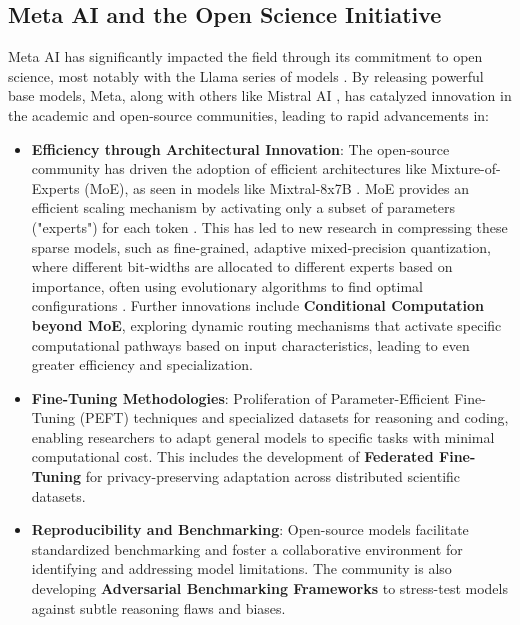 \documentclass{article}
\begin{document}
\subsection{Meta AI and the Open Science Initiative}
Meta AI has significantly impacted the field through its commitment to open science, most notably with the Llama series of models \cite{touvron2023llama}. By releasing powerful base models, Meta, along with others like Mistral AI \cite{jiang2024mixtral}, has catalyzed innovation in the academic and open-source communities, leading to rapid advancements in:
\begin{itemize}
    \item \textbf{Efficiency through Architectural Innovation}: The open-source community has driven the adoption of efficient architectures like Mixture-of-Experts (MoE), as seen in models like Mixtral-8x7B \cite{jiang2024mixtral}. MoE provides an efficient scaling mechanism by activating only a subset of parameters ("experts") for each token \cite{jiang2024mixtral}. This has led to new research in compressing these sparse models, such as fine-grained, adaptive mixed-precision quantization, where different bit-widths are allocated to different experts based on importance, often using evolutionary algorithms to find optimal configurations \cite{dettmers2023qlora}. Further innovations include \textbf{Conditional Computation beyond MoE}, exploring dynamic routing mechanisms that activate specific computational pathways based on input characteristics, leading to even greater efficiency and specialization.
    \item \textbf{Fine-Tuning Methodologies}: Proliferation of Parameter-Efficient Fine-Tuning (PEFT) techniques \cite{houlsby2019parameterefficient} and specialized datasets for reasoning and coding, enabling researchers to adapt general models to specific tasks with minimal computational cost. This includes the development of \textbf{Federated Fine-Tuning} for privacy-preserving adaptation across distributed scientific datasets.
    \item \textbf{Reproducibility and Benchmarking}: Open-source models facilitate standardized benchmarking and foster a collaborative environment for identifying and addressing model limitations. The community is also developing \textbf{Adversarial Benchmarking Frameworks} to stress-test models against subtle reasoning flaws and biases.
\end{itemize}
\end{document}
